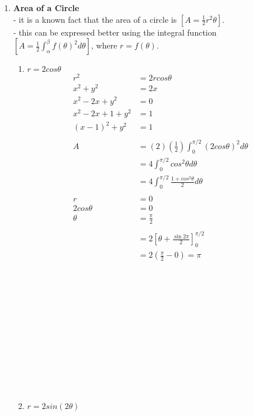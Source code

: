 \documentclass{article}
\begin{document}
\begin{enumerate}
\begin{enumerate}
    \end{enumerate}
    \item \textbf{Area of a Circle} \\
    - it is a known fact that the area of a circle is $[A=\frac{1}{2}r^2\theta]$. \\
    - this can be expressed better using the integral function $[A=\frac{1}{2}\int_{\alpha}^{\beta}f(\theta)^2d\theta]$, where $r=f(\theta)$. \\
    \begin{enumerate}
        \item \textbf{$r=2cos\theta$}
        \begin{align*}
            r^2&=2rcos\theta \\
            x^2+y^2&=2x \\
            x^2-2x+y^2&=0 \\
            x^2-2x+1+y^2&=1 \\
            (x-1)^2+y^2&=1 \\
            \\
            A&=(2)(\frac{1}{2})\int_{0}^{\pi/2}(2cos\theta)^2d\theta \\
            &=4\int_{0}^{\pi/2}cos^2\theta d\theta \\
            &=4\int_{0}^{\pi/2}\frac{1+cos^2\theta}{2} d\theta \\
            \\
            r&=0 \\
            2cos\theta&=0 \\
            \theta&=\frac{\pi}{2} \\
            \\
            &=2[\theta+\frac{\sin2\pi}{2}]_{0}^{\pi/2} \\
            &=2(\frac{\pi}{2}-0)=\pi \\
        \end{align*}
        \\\\\\\\\\\\\\\\\\\\\\\item \textbf{$r=2sin(2\theta)$} \\
        \begin{align*}

\end{align*}
\end{enumerate}
\end{enumerate}
\end{document}
